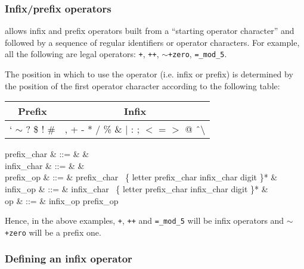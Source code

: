 \subsubsection{Infix/prefix operators}

{\focal} allows infix and prefix operators built from a
``starting operator character'' and followed by a sequence of
regular identifiers or operator characters. For example, all the
following are legal operators:
{\tt +}, {\tt ++}, {\tt $\sim$+zero}, {\tt =\_mod\_5}.

The position in which to use the operator (i.e. infix or prefix)
is determined by the position of the first operator character
according to the following table:
\begin{center}
\begin{tabular}{|c|c|}
\hline
Prefix & Infix \\
\hline
` $\sim$ ? \$ ! \#                            &
, + - * / \% \& $|$ : ; $<$ = $>$ @ \^\ $\setminus$ \\
\hline
\end{tabular}
\end{center}

\begin{syntax}
prefix\_char & ::= & & \\
 infix\_char & ::= &
     & \\
  prefix\_op & ::= & prefix\_char
    \ \{ letter \mid prefix\_char \mid infix\_char
    \mid digit \mid \terminal{\_} \}* & \\
   infix\_op & ::= & infix\_char
    \ \{ letter \mid prefix\_char \mid infix\_char
    \mid digit \mid \terminal{\_} \}* & \\
    op & ::= & infix\_op \mid prefix\_op
\end{syntax}

Hence, in the above examples, {\tt +}, {\tt ++} and {\tt =\_mod\_5} will be
infix operators and {\tt $\sim$+zero} will be a prefix one.

\subsubsection{Defining an infix operator}

